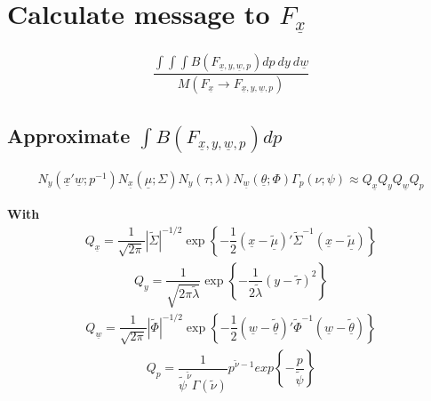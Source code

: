 \documentclass[fleqn]{minimal}
\begin{document}
\section{Calculate message to $F_{\underline{x}}$}

\begin{align*}
  \dfrac{\int \int \int B\left(F_{\underline{x}, y, \underline{w}, p}\right) dp \ dy \ d\underline{w}}
  {
    M\left(
      F_{\underline{x}} \rightarrow
      F_{\underline{x}, y, \underline{w}, p}
    \right)
  }
\end{align*}

\subsection{Approximate $\int B\left(F_{\underline{x}, y, \underline{w}, p}\right) dp$}

\begin{align*}
  N_y\left(\underline{x}'\underline{w} ; p^{-1}\right)
  N_{\underline{x}} \left( \underline{\mu} ; \Sigma\right)
  N_{y} \left( \tau ; \lambda\right)
  N_{\underline{w}} \left( \underline{\theta} ; \Phi\right)
  \Gamma_p \left( \nu ; \psi \right)
  \approx
  Q_{\underline{x}} Q_{y} Q_{\underline{w}} Q_{p}
\end{align*}

\textbf{With}
\begin{align*}
  Q_{\underline{x}} =
  \dfrac{1}{\sqrt{2\pi}}
  \left| \tilde{\Sigma} \right|^{-1/2}
  \exp
  \left\{
    - \dfrac{1}{2}
    \left( \underline{x} - \underline{\tilde{\mu}}\right)'
    \tilde{\Sigma}^{-1}
    \left( \underline{x} - \underline{\tilde{\mu}}\right)
  \right\}
\end{align*}
\begin{align*}
  Q_y =
  \dfrac{1}{\sqrt{2\pi\tilde{\lambda}}}
  \exp
  \left\{
    - \dfrac{1}{2\tilde{\lambda}}
    \left(y - \tilde{\tau}\right)^2
  \right\}
\end{align*}
\begin{align*}
  Q_{\underline{w}} =
  \dfrac{1}{\sqrt{2\pi}}
  \left| \tilde{\Phi} \right|^{-1/2}
  \exp
  \left\{
    - \dfrac{1}{2}
    \left( \underline{w} - \underline{\tilde{\theta}}\right)'
    \tilde{\Phi}^{-1}
    \left( \underline{w} - \underline{\tilde{\theta}}\right)
  \right\}
\end{align*}
\begin{align*}
  Q_{p}
  = \dfrac{1}{\tilde{\psi}^{\tilde{\nu}} \Gamma(\tilde{\nu})}
  p^{\tilde{\nu}-1}
  exp
  \left\{
    - \dfrac{p}{\tilde{\psi}}
  \right\}
\end{align*}
\end{document}
